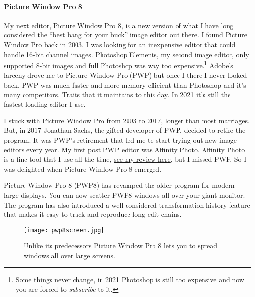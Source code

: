 \paragraph{Picture Window Pro 8}\label{picture-window-pro-8}

My next editor, \href{https://www.dl-c.com/Downloads.html}{Picture
Window Pro 8}, is a new version of what I have long considered the
``best bang for your buck'' image editor out there. I found Picture
Window Pro back in 2003. I was looking for an inexpensive editor that
could handle 16-bit channel images. Photoshop Elements, my second image
editor, only supported 8-bit images and full Photoshop was way too
expensive.\footnote{Some things never change, in 2021 Photoshop is still too expensive and
  now you are forced to \emph{subscribe} to
  it.} Adobe's larceny
drove me to Picture Window Pro (PWP) but once I there I never looked
back. PWP was much faster and more memory efficient than Photoshop and
it's many competitors. Traits that it maintains to this day. In 2021
it's still the fastest loading editor I use.

I stuck with Picture Window Pro from 2003 to 2017, longer than most
marriages. But, in 2017 Jonathan Sachs, the gifted developer of PWP,
decided to retire the program. It was PWP's retirement that led me to
start trying out new image editors every year. My first post PWP editor
was \href{https://affinity.serif.com/en-gb/photo/}{Affinity Photo}.
Affinity Photo is a fine tool that I use all the time,
\href{https://analyzethedatanotthedrivel.org/2017/01/22/affinity-photo-review/}{see
my review here}, but I missed PWP. So I was delighted when Picture
Window Pro 8 emerged.

Picture Window Pro 8 (PWP8) has revamped the older program for modern
large displays. You can now scatter PWP8 windows all over your giant
monitor. The program has also introduced a well considered
transformation history feature that makes it easy to track and reproduce
long edit chains.


\captionsetup[figure]{labelformat=empty}
 \begin{SCfigure}[50]
 \centering
\texttt{[image: pwp8screen.jpg]}
\caption{Unlike its predecessors \href{https://www.dl-c.com/Downloads.html}{Picture Window Pro 8} lets you to
spread  windows all over large screens.} 
\label{fig:7048X4}
\end{SCfigure}


